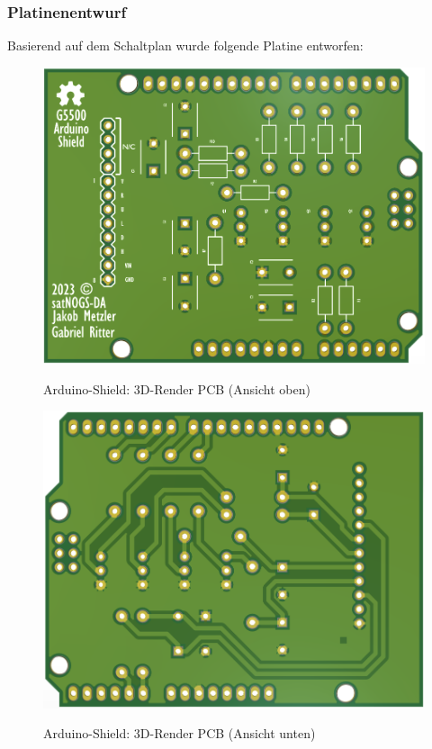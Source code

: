 \subsubsection{Platinenentwurf}
Basierend auf dem Schaltplan wurde folgende Platine entworfen:
\begin{figure}[H]
	\begin{minipage}[b]{.4\linewidth} %
		\includegraphics[width=\linewidth]{../ref/PCBArduinoShieldGS232.png}
		\label{fig:PCB_Arduino-Shield_vorne}
		\caption{Arduino-Shield: 3D-Render PCB (Ansicht oben)}
	\end{minipage}
	\hspace{.1\linewidth}%
	\begin{minipage}[b]{.4\linewidth} %
		\includegraphics[width=\linewidth]{../ref/PCBArduinoShieldBackGS232.png}
		\label{fig:PCB_Arduino-Shield_hinten}
		\caption{Arduino-Shield: 3D-Render PCB (Ansicht unten)}
	\end{minipage}
\end{figure}

